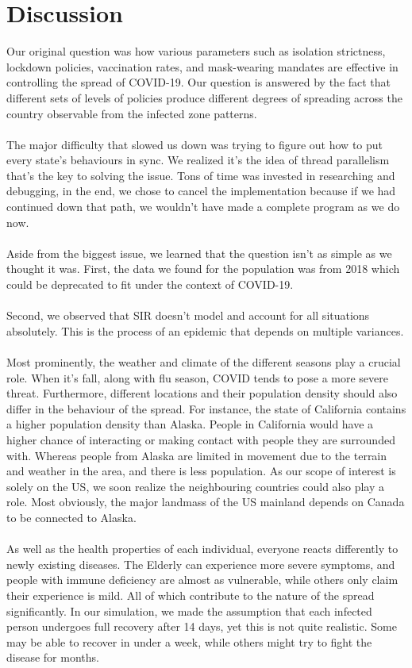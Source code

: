 \documentclass[12pt]{article}
\begin{document}
\section{Discussion}
Our original question was how various parameters such as isolation strictness, lockdown policies, vaccination rates, and mask-wearing mandates are effective in controlling the spread of COVID-19. Our question is answered by the fact that different sets of levels of policies produce different degrees of spreading across the country observable from the infected zone patterns.\\\\
The major difficulty that slowed us down was trying to figure out how to put every state's behaviours in sync. We realized it's the idea of thread parallelism that's the key to solving the issue. Tons of time was invested in researching and debugging, in the end, we chose to cancel the implementation because if we had continued down that path, we wouldn't have made a complete program as we do now.\\\\
Aside from the biggest issue, we learned that the question isn't as simple as we thought it was. First, the data we found for the population was from 2018 which could be deprecated to fit under the context of COVID-19.\\\\
Second, we observed that SIR doesn't model and account for all situations absolutely. This is the process of an epidemic that depends on multiple variances.\\\\
Most prominently, the weather and climate of the different seasons play a crucial role. When it's fall, along with flu season, COVID tends to pose a more severe threat. Furthermore, different locations and their population density should also differ in the behaviour of the spread. For instance, the state of California contains a higher population density than Alaska. People in California would have a higher chance of interacting or making contact with people they are surrounded with. Whereas people from Alaska are limited in movement due to the terrain and weather in the area, and there is less population. As our scope of interest is solely on the US, we soon realize the neighbouring countries could also play a role. Most obviously, the major landmass of the US mainland depends on Canada to be connected to Alaska.\\\\
As well as the health properties of each individual, everyone reacts differently to newly existing diseases. The Elderly can experience more severe symptoms, and people with immune deficiency are almost as vulnerable, while others only claim their experience is mild. All of which contribute to the nature of the spread significantly. In our simulation, we made the assumption that each infected person undergoes full recovery after 14 days, yet this is not quite realistic. Some may be able to recover in under a week, while others might try to fight the disease for months.\\\\
\end{document}
